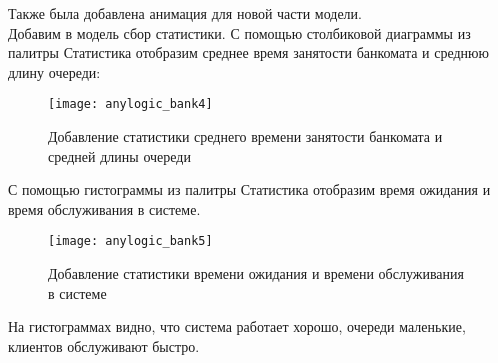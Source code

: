 \newpage

Также была добавлена анимация для новой части модели.\\

Добавим в модель сбор статистики. С помощью столбиковой диаграммы из палитры Статистика отобразим среднее время занятости банкомата и среднюю длину очереди:
\begin{figure}[h]
	\centering \texttt{[image: anylogic\_bank4]}
	\caption{Добавление статистики среднего времени занятости банкомата и средней длины очереди}
	\label{fig:anylogic_bank4}
\end{figure}

С помощью гистограммы из палитры Статистика отобразим время ожидания и время обслуживания в системе.
\begin{figure}[h]
	\centering \texttt{[image: anylogic\_bank5]}
	\caption{Добавление статистики времени ожидания и времени обслуживания в системе}
	\label{fig:anylogic_bank5}
\end{figure}

На гистограммах видно, что система работает хорошо, очереди маленькие, клиентов обслуживают быстро.